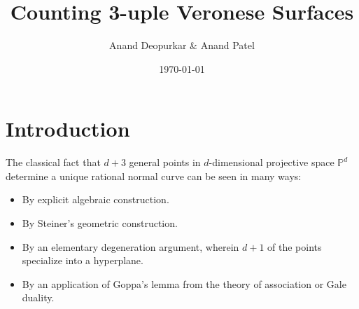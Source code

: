 \documentclass[reqno, 11pt]{amsart}
\author{Anand Deopurkar \& Anand Patel}
\title{Counting 3-uple Veronese Surfaces}
\date{\today}
\theoremstyle{plain}
\theoremstyle{remark}
\renewcommand{\P}{\mathbb{P}}
\begin{document}
\maketitle

\section{Introduction} 

The classical fact that $d+3$ general points
in $d$-dimensional projective space $\P^{d}$ determine a unique rational
normal curve can be seen in many ways:
\begin{itemize}
\item By explicit algebraic construction.
\item By Steiner's geometric construction.
\item By an elementary degeneration argument, wherein $d+1$ of the points specialize into a hyperplane.
\item By an application of Goppa's lemma from the theory of association or Gale duality. 
\end{itemize}
\end{document}
